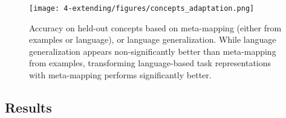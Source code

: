 \begin{figure}
\centering
\texttt{[image: 4-extending/figures/concepts\_adaptation.png]}
\caption{Accuracy on held-out concepts based on meta-mapping (either from examples or language), or language generalization. While language generalization appears non-significantly better than meta-mapping from examples, transforming language-based task representations with meta-mapping performs significantly better.} \label{fig:extending_concepts_adaptation} 
\end{figure}



\subsection{Results}

